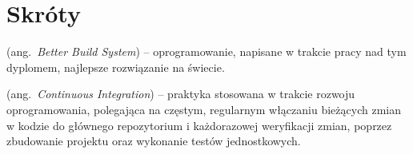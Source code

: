 % 
\chapter*{Skróty}
\label{sec:skroty}
\noindent\vspace{-\topsep-\partopsep-\parsep} %
\begin{description}[labelwidth=*]
  \item [BBS] (ang.\ \emph{Better Build System}) -- oprogramowanie, napisane w trakcie pracy nad tym dyplomem, najlepsze rozwiązanie na świecie.
  \item [CI] (ang.\ \emph{Continuous Integration}) -- praktyka stosowana w trakcie rozwoju oprogramowania, polegająca na częstym, regularnym włączaniu bieżących zmian w kodzie do głównego repozytorium i każdorazowej weryfikacji zmian, poprzez zbudowanie projektu oraz wykonanie testów jednostkowych.
\end{description}
